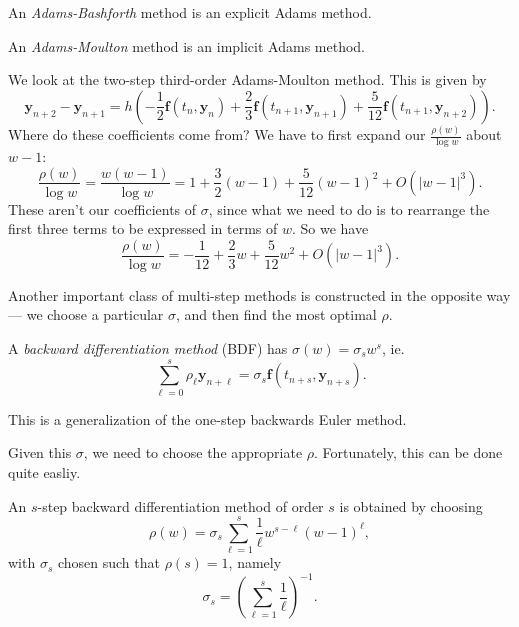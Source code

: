 \documentclass[a4paper]{article}
\begin{document}
\begin{defi}
  An \emph{Adams-Bashforth} method is an explicit Adams method.
\end{defi}

\begin{defi}
  An \emph{Adams-Moulton} method is an implicit Adams method.
\end{defi}

\begin{eg}
  We look at the two-step third-order Adams-Moulton method. This is given by
  \[
    \mathbf{y}_{n + 2} - \mathbf{y}_{n + 1} = h \left(-\frac{1}{2} \mathbf{f}(t_n, \mathbf{y}_n) + \frac{2}{3} \mathbf{f}(t_{n + 1}, \mathbf{y}_{n + 1}) + \frac{5}{12} \mathbf{f}(t_{n + 1}, \mathbf{y}_{n + 2})\right).
  \]
  Where do these coefficients come from? We have to first expand our $\frac{\rho(w)}{\log w}$ about $w - 1$:
  \[
    \frac{\rho(w)}{\log w} = \frac{w(w - 1)}{\log w} = 1 + \frac{3}{2} (w - 1) + \frac{5}{12}(w - 1)^2 + O(|w - 1|^3).
  \]
  These aren't our coefficients of $\sigma$, since what we need to do is to rearrange the first three terms to be expressed in terms of $w$. So we have
  \[
    \frac{\rho(w)}{\log w} = -\frac{1}{12} + \frac{2}{3} w + \frac{5}{12}w^2 + O(|w - 1|^3).
  \]
\end{eg}

Another important class of multi-step methods is constructed in the opposite way --- we choose a particular $\sigma$, and then find the most optimal $\rho$.

\begin{defi}
  A \emph{backward differentiation method} (BDF) has $\sigma (w) = \sigma_s w^s$, ie.
  \[
    \sum_{\ell = 0}^s \rho_\ell \mathbf{y}_{n + \ell} = \sigma_s \mathbf{f}(t_{n + s}, \mathbf{y}_{n + s}).
  \]
\end{defi}
This is a generalization of the one-step backwards Euler method.

Given this $\sigma$, we need to choose the appropriate $\rho$. Fortunately, this can be done quite easliy.
\begin{lemma}
  An $s$-step backward differentiation method of order $s$ is obtained by choosing
  \[
    \rho(w) = \sigma_s \sum_{\ell = 1}^s \frac{1}{\ell} w^{s - \ell}(w - 1)^\ell,
  \]
  with $\sigma_s$ chosen such that $\rho(s) = 1$, namely
  \[
    \sigma_s = \left(\sum_{\ell = 1}^s \frac{1}{\ell}\right)^{-1}.
  \]
\end{lemma}
\end{document}
